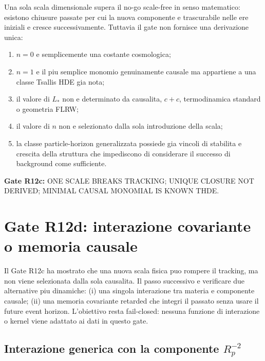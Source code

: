 \documentclass[11pt,a4paper]{article}
\newcommand{\status}[1]{\textsf{#1}}
\begin{document}
Una sola scala dimensionale supera il no-go scale-free in senso matematico: esistono chiusure passate per cui la nuova componente e trascurabile nelle ere iniziali e cresce successivamente. Tuttavia il gate non fornisce una derivazione unica:
\begin{enumerate}
\item $n=0$ e semplicemente una costante cosmologica;
\item $n=1$ e il piu semplice monomio genuinamente causale ma appartiene a una classe Tsallis HDE gia nota;
\item il valore di $L_*$ non e determinato da causalita, $c+c$, termodinamica standard o geometria FLRW;
\item il valore di $n$ non e selezionato dalla sola introduzione della scala;
\item la classe particle-horizon generalizzata possiede gia vincoli di stabilita e crescita della struttura che impediscono di considerare il successo di background come sufficiente.
\end{enumerate}

\textbf{Gate R12c:} \status{ONE SCALE BREAKS TRACKING; UNIQUE CLOSURE NOT DERIVED; MINIMAL CAUSAL MONOMIAL IS KNOWN THDE}.


\section{Gate R12d: interazione covariante o memoria causale}

Il Gate R12c ha mostrato che una nuova scala fisica puo rompere il tracking, ma non viene selezionata dalla sola causalita. Il passo successivo e verificare due alternative piu dinamiche: (i) una singola interazione tra materia e componente causale; (ii) una memoria covariante retarded che integri il passato senza usare il future event horizon. L'obiettivo resta fail-closed: nessuna funzione di interazione o kernel viene adattato ai dati in questo gate.

\subsection{Interazione generica con la componente $R_p^{-2}$}
\end{document}
